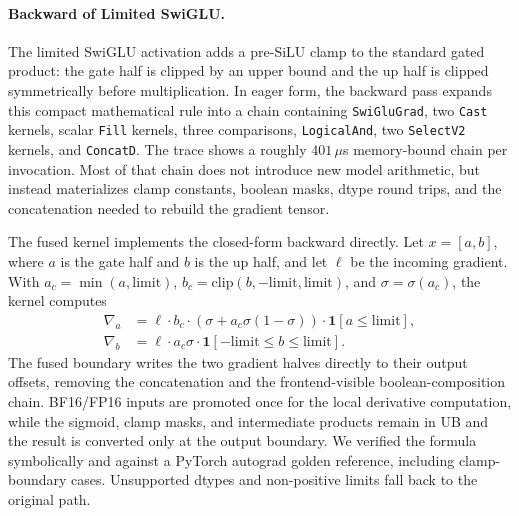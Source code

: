 \paragraph{Backward of Limited SwiGLU.}
The limited SwiGLU activation adds a pre-SiLU clamp to the standard gated product: the gate half is clipped by an upper bound and the up half is clipped symmetrically before multiplication. In eager form, the backward pass expands this compact mathematical rule into a chain containing \texttt{SwiGluGrad}, two \texttt{Cast} kernels, scalar \texttt{Fill} kernels, three comparisons, \texttt{LogicalAnd}, two \texttt{SelectV2} kernels, and \texttt{ConcatD}. The trace shows a roughly $401\,\mu$s memory-bound chain per invocation. Most of that chain does not introduce new model arithmetic, but instead materializes clamp constants, boolean masks, dtype round trips, and the concatenation needed to rebuild the gradient tensor.

The fused kernel implements the closed-form backward directly. Let $x=[a,b]$, where $a$ is the gate half and $b$ is the up half, and let $\ell$ be the incoming gradient. With $a_c=\min(a,\mathrm{limit})$, $b_c=\mathrm{clip}(b,-\mathrm{limit},\mathrm{limit})$, and $\sigma=\sigma(a_c)$, the kernel computes
\begin{align}
  \nabla_a &=\ell \cdot b_c \cdot \left(\sigma+a_c\sigma(1-\sigma)\right)\cdot \mathbf{1}[a\le \mathrm{limit}], \\
  \nabla_b &=\ell \cdot a_c\sigma \cdot \mathbf{1}[-\mathrm{limit}\le b\le \mathrm{limit}].
\end{align}
The fused boundary writes the two gradient halves directly to their output offsets, removing the concatenation and the frontend-visible boolean-composition chain. BF16/FP16 inputs are promoted once for the local derivative computation, while the sigmoid, clamp masks, and intermediate products remain in UB and the result is converted only at the output boundary. We verified the formula symbolically and against a PyTorch autograd golden reference, including clamp-boundary cases. Unsupported dtypes and non-positive limits fall back to the original path.

